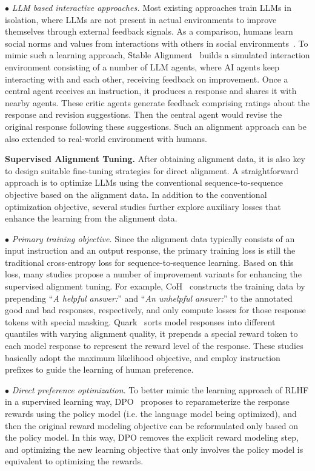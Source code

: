 {{$\bullet$ {\textit{LLM based interactive approaches.} Most existing approaches train LLMs in isolation, where LLMs are not present in actual  environments to improve themselves through external feedback signals. As a comparison, humans learn social norms and values from interactions with others in social environments~\cite{Krishna-PNAS-2022-Socially}. To mimic such a learning approach, Stable Alignment~\cite{Liu-arxiv-2023-training} builds a simulated interaction environment  consisting of a number of LLM agents, where AI agents keep interacting with and  each other, receiving feedback on improvement. Once a central agent receives an instruction, it produces a response and shares it with nearby agents. These critic  agents generate feedback comprising ratings about the response and revision  suggestions. Then the central agent would revise the original response following these suggestions. } Such an alignment approach can be also extended to real-world environment with humans. 

\textbf{Supervised Alignment Tuning.} {After obtaining alignment data,} it is also key to design suitable fine-tuning strategies for direct alignment. A straightforward approach is to optimize LLMs  using the conventional sequence-to-sequence objective based on the alignment data. In addition to the conventional optimization objective, several studies further explore auxiliary losses that enhance the learning from the alignment data.}

$\bullet$ \textit{Primary training objective.} Since the alignment data typically consists of an input instruction and an output response, the primary training loss is still the traditional cross-entropy loss for sequence-to-sequence learning. Based on this loss, many studies propose a number of improvement variants for enhancing the supervised alignment tuning. For example, CoH~\cite{Liu-arxiv-2023-Chain} constructs the training data by prepending ``\emph{A helpful answer:}'' and ``\emph{An unhelpful answer:}'' to the annotated good and bad responses, respectively, and only compute losses for those response tokens with special masking.  Quark~\cite{Lu-nips-2022-quark} sorts model responses into different quantiles with varying alignment quality, it prepends a special reward token to each model response to represent the reward level of the response. These studies basically adopt the maximum likelihood objective, and employ instruction prefixes to guide the learning of human preference. 

$\bullet$ \emph{Direct preference optimization}. To better mimic the learning approach of RLHF in a supervised learning way, DPO~\cite{Rafailov-arxiv-2023-Direct} proposes to reparameterize the response rewards using the policy model (i.e. the language model being optimized), and then the original reward modeling objective can be reformulated only based on the policy model. In this way, DPO removes the explicit reward modeling step, and optimizing the new learning objective that only involves the policy model is equivalent to optimizing the rewards.

}
